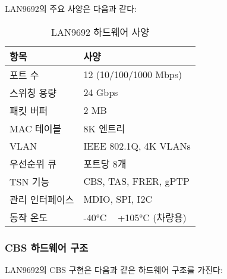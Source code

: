 \documentclass[twocolumn,10pt]{article}
\begin{document}
LAN9692의 주요 사양은 다음과 같다:

\begin{table}[h]
\centering
\caption{LAN9692 하드웨어 사양}
\label{tab:lan9692_specs}
\begin{tabular}{ll}
\toprule
\textbf{항목} & \textbf{사양} \\
\midrule
포트 수 & 12 (10/100/1000 Mbps) \\
스위칭 용량 & 24 Gbps \\
패킷 버퍼 & 2 MB \\
MAC 테이블 & 8K 엔트리 \\
VLAN & IEEE 802.1Q, 4K VLANs \\
우선순위 큐 & 포트당 8개 \\
TSN 기능 & CBS, TAS, FRER, gPTP \\
관리 인터페이스 & MDIO, SPI, I2C \\
동작 온도 & -40°C ~ +105°C (차량용) \\
\bottomrule
\end{tabular}
\end{table}

\subsubsection{CBS 하드웨어 구조}

LAN9692의 CBS 구현은 다음과 같은 하드웨어 구조를 가진다:
\end{document}
